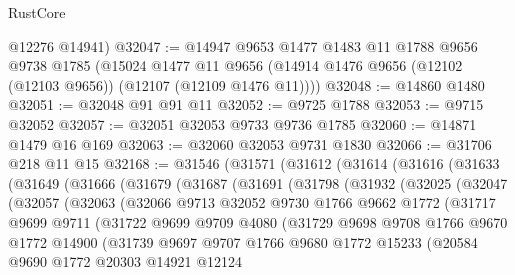 \begin{lexlean}{RustCore}
\begin{coremodule}
      @12276
      @14941)
@32047 := @14947
    @9653
    @1477
    @1483
    @11
    @1788
    @9656
    @9738
    @1785
    (@15024
      @1477
      @11
      @9656
      (@14914 @1476 @9656 (@12102 (@12103 @9656)) (@12107 (@12109 @1476 @11))))
@32048 := @14860 @1480
@32051 := @32048 @91 @91 @11
@32052 := @9725 @1788
@32053 := @9715 @32052
@32057 := @32051 @32053 @9733 @9736 @1785
@32060 := @14871 @1479 @16 @169
@32063 := @32060 @32053 @9731 @1830
@32066 := @31706 @218 @11 @15
@32168 := @31546
    (@31571
      (@31612
        (@31614
          (@31616
            (@31633
              (@31649
                (@31666
                  (@31679
                    (@31687
                      (@31691
                        (@31798
                          (@31932
                            (@32025
                              (@32047
                                (@32057
                                  (@32063
                                    (@32066
                                      @9713
                                      @32052
                                      @9730
                                      @1766
                                      @9662
                                      @1772
                                      (@31717
                                        @9699
                                        @9711
                                        (@31722
                                          @9699
                                          @9709
                                          @4080
                                          (@31729
                                            @9698
                                            @9708
                                            @1766
                                            @9670
                                            @1772
                                            @14900
                                            (@31739
                                              @9697
                                              @9707
                                              @1766
                                              @9680
                                              @1772
                                              @15233
                                              (@20584
                                                @9690
                                                @1772
                                                @20303
                                                @14921
                                                @12124

\end{coremodule}
\end{lexlean}
